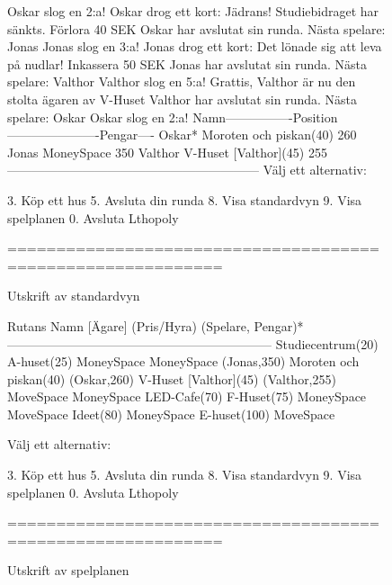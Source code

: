 \begin{figure}[H]
\centering

\begin{REPL}
Oskar slog en 2:a!
Oskar drog ett kort: Jädrans! Studiebidraget har sänkts. Förlora 40 SEK
Oskar har avslutat sin runda.
Nästa spelare: Jonas
Jonas slog en 3:a!
Jonas drog ett kort: Det lönade sig att leva på nudlar! Inkassera 50 SEK
Jonas har avslutat sin runda.
Nästa spelare: Valthor
Valthor slog en 5:a!
Grattis, Valthor är nu den stolta ägaren av V-Huset
Valthor har avslutat sin runda.
Nästa spelare: Oskar
Oskar slog en 2:a!
Namn----------------Position----------------------Pengar----
Oskar*              Moroten och piskan(40)        260
Jonas               MoneySpace                    350
Valthor             V-Huset [Valthor](45)         255
------------------------------------------------------------
Välj ett alternativ:

	3. Köp ett hus
	5. Avsluta din runda
	8. Visa standardvyn
	9. Visa spelplanen
	0. Avsluta Lthopoly

============================================================

\end{REPL}
\caption {Utskrift av standardvyn}
\label{fig:scalajava:lthopoly-team:defaultview}
\end{figure}

\begin{figure}[H]
\centering

\begin{REPL}
Rutans Namn [Ägare] (Pris/Hyra) (Spelare, Pengar)*
---------------------------------------------------------------
Studiecentrum(20)
A-huset(25)
MoneySpace
MoneySpace (Jonas,350)
Moroten och piskan(40) (Oskar,260)
V-Huset [Valthor](45) (Valthor,255)
MoveSpace
MoneySpace
LED-Cafe(70)
F-Huset(75)
MoneySpace
MoveSpace
Ideet(80)
MoneySpace
E-huset(100)
MoveSpace

Välj ett alternativ:

	3. Köp ett hus
	5. Avsluta din runda
	8. Visa standardvyn
	9. Visa spelplanen
	0. Avsluta Lthopoly

============================================================
\end{REPL}

\caption {Utskrift av spelplanen}
\label{fig:scalajava:lthopoly-team:boardview}
\end{figure}

